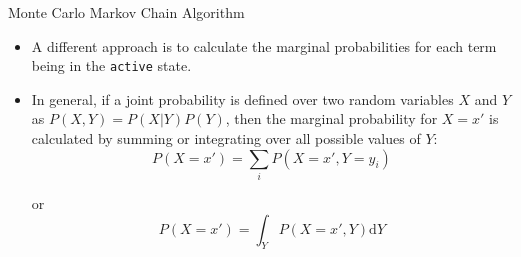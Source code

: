 \documentclass{beamer}
\begin{document}
\begin{frame}{Monte Carlo Markov Chain Algorithm}
 \begin{itemize}
  \item A different approach is to calculate the marginal probabilities for
each term being in the \texttt{active} state. 
\item In general, if a joint
probability is defined over two random variables $X$ and $Y$ as
$P(X,Y)=P(X|Y)P(Y)$, then the marginal
probability for $X=x'$ is calculated by summing or integrating over all
possible values of $Y$:
\begin{equation}
 P(X=x')=\sum_{i} P(X=x',Y=y_i)
\end{equation}


  or
  \begin{equation}
   P(X=x')=\int_Y P(X=x',Y) \mathrm{d}Y
  \end{equation}


 \end{itemize}

 

\end{frame}

\end{document}
